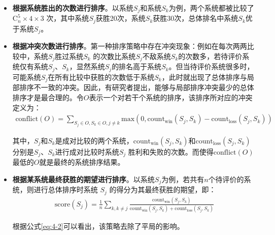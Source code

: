 \begin{itemize}
\vspace{0.5em}
\item {\small\sffamily\bfseries{根据系统胜出的次数进行排序}}。以系统${S}_j$和系统${S}_k$为例，两个系统都被比较了$\textrm{C}_n^5 \times 4 \times 3$ 次，其中系统${S}_j$获胜20次，系统${S}_k$获胜30次，总体排名中系统${S}_k$优于系统${S}_j$。
\vspace{0.5em}
\item {\small\sffamily\bfseries{根据冲突次数进行排序}}。第一种排序策略中存在冲突现象：例如在每次两两比较中，系统${S}_j$胜过系统${S}_k$ 的次数比系统${S}_j$不敌系统${S}_k$的次数多，若待评价系统仅有系统${S}_j$、${S}_k$，显然系统${S}_j$的排名高于系统${S}_k$。但当待评价系统很多时，可能系统${S}_j$在所有比较中获胜的次数低于系统${S}_k$，此时就出现了总体排序与局部排序不一致的冲突。因此，有研究者提出，能够与局部排序冲突最少的总体排序才是最合理的。令$O$表示一个对若干个系统的排序，该排序所对应的冲突定义为：
\begin{eqnarray}
\textrm{conflict}(O) = \sum\limits_{{{S}_j} \in O,{{S}_k} \in O,j \ne k} {{\textrm{max}}(0,\textrm{count}_{\textrm{win}}({{S}_j},{{S}_k}) - \textrm{count}_{\textrm{loss}}({{S}_j},{{S}_k}))}
\label{eq:4-1}
\end{eqnarray}

    其中，${S}_j$和${S}_k$是成对比较的两个系统，$\textrm{count}_{\textrm{win}}({S}_j,{S}_k)$和$\textrm{count}_{\textrm{loss}}({S}_j,{S}_k)$分别是${S}_j$、${S}_k$进行成对比较时系统${S}_j$ 胜利和失败的次数。而使得$\textrm{conflict}(O)$最低的$O$就是最终的系统排序结果。

\vspace{0.5em}
\item {\small\sffamily\bfseries{根据某系统最终获胜的期望进行排序}}。以系统${S}_j$为例，若共有$n$个待评价的系统，则进行总体排序时系统 ${S}_j$ 的得分为其最终获胜的期望，即：
\begin{eqnarray}
\textrm{score}({{S}_j}) = \frac{1}{n}\sum\limits_{k,k \ne j} {\frac{\textrm{count}_{\textrm{win}}({{S}_j},{{S}_k})}{{\textrm{count}_{\textrm{win}}({{S}_j},{{S}_k}) + \textrm{count}_{\textrm{loss}}({{S}_j},{{S}_k})}}}
\label{eq:4-2}
\end{eqnarray}

根据公式\eqref{eq:4-2}可以看出，该策略去除了平局的影响。

\vspace{0.5em}
\end{itemize}

